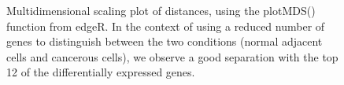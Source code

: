 \documentclass[a4paper,12pt]{report}
\begin{document}
\begin{figure}[H]
	\centering
	\hfill	
	
	\caption{Multidimensional scaling plot of distances, using the plotMDS() function from edgeR. In the context of using a reduced number of genes to distinguish between the two conditions (normal adjacent cells and cancerous cells), we observe a good separation with the top 12 of the differentially expressed genes.}
	
\end{figure}
\end{document}
